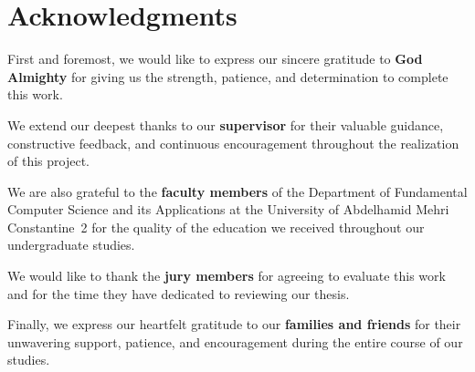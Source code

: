 
\chapter*{Acknowledgments}

\vspace{0.5cm}

First and foremost, we would like to express our sincere gratitude to \textbf{God Almighty} for giving us the strength, patience, and determination to complete this work.

We extend our deepest thanks to our \textbf{supervisor} for their valuable guidance, constructive feedback, and continuous encouragement throughout the realization of this project.

We are also grateful to the \textbf{faculty members} of the Department of Fundamental Computer Science and its Applications at the University of Abdelhamid Mehri Constantine~2 for the quality of the education we received throughout our undergraduate studies.

We would like to thank the \textbf{jury members} for agreeing to evaluate this work and for the time they have dedicated to reviewing our thesis.

Finally, we express our heartfelt gratitude to our \textbf{families and friends} for their unwavering support, patience, and encouragement during the entire course of our studies.
